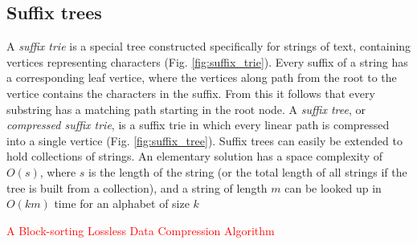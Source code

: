 \documentclass[thesis.tex]{subfiles}
\begin{document}
\subsection{Suffix trees}
A \textit{suffix trie} is a special tree constructed specifically for strings of text, containing vertices representing characters (Fig. \ref{fig:suffix_trie}). Every suffix of a string has a corresponding leaf vertice, where the vertices along path from the root to the vertice contains the characters in the suffix. From this it follows that every substring has a matching path starting in the root node. A \textit{suffix tree}, or \textit{compressed suffix trie}, is a suffix trie in which every linear path is compressed into a single vertice (Fig. \ref{fig:suffix_tree}). Suffix trees can easily be extended to hold collections of strings\cite[Chapter 20]{algorithms_sequential_parallell_and_distributed}. An elementary solution has a space complexity of $O(s)$, where $s$ is the length of the string (or the total length of all strings if the tree is built from a collection), and a string of length $m$ can be looked up in $O(km)$ time for an alphabet of size $k$\cite[Section 20.6.1]{algorithms_sequential_parallell_and_distributed}\\
\par\noindent
\textcolor{red}{A Block-sorting Lossless Data Compression Algorithm}
\end{document}
